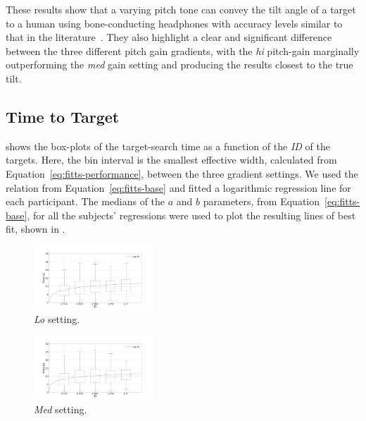 \documentclass[sigconf, review=true, screen=true, anonymous=true]{acmart}
\begin{document}
These results show that a varying pitch tone can convey the tilt angle of a target to a human using bone-conducting headphones with accuracy levels similar to that in the literature~\cite{bujacz2011sonification, katz2011spatial, zotkin2004rendering}. They also highlight a clear and significant difference between the three different pitch gain gradients, with the \emph{hi} pitch-gain marginally outperforming the \emph{med} gain setting and producing the results closest to the true tilt. 

\subsection{Time to Target}

 shows the box-plots of the target-search time as a function of the \emph{ID} of the targets.
Here, the bin interval is the smallest effective width, calculated from Equation~\ref{eq:fitts-performance}, between the three gradient settings.
We used the relation from Equation~\ref{eq:fitts-base} and fitted a logarithmic regression line for each participant.
The medians of the $a$ and $b$ parameters, from Equation~\ref{eq:fitts-base}, for all the subjects' regressions were used to plot the resulting lines of best fit, shown in . 

\begin{figure}
  \centering
  \includegraphics[clip, trim=120 20 120 20, width=0.4\textwidth]{figures/fitts_lo.png}
  \caption{\emph{Lo} setting. }\label{fig:fitts-lo}
\end{figure}

\begin{figure}
  \centering
  \includegraphics[clip, trim=120 20 120 20, width=0.4\textwidth]{figures/fitts_med.png}
  \caption{\emph{Med} setting. }
  \label{fig:fitts-med}
\end{figure}
\end{document}
